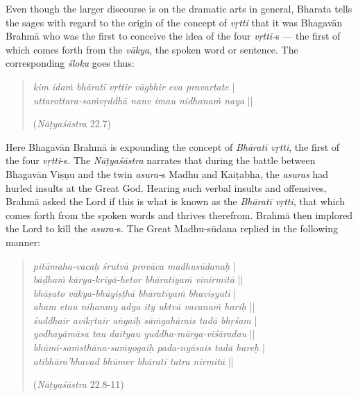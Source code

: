 Even though the larger discourse is on the dramatic arts in general, Bharata tells the sages with regard to the origin of the concept of \textsl{vṛtti} that it was Bhagavān Brahmā who was the first to conceive the idea of the four \textsl{vṛtti-}s --- the first of which comes forth from the \textsl{vākya}, the spoken word or sentence. The corresponding \textsl{śloka} goes thus:
\begin{quote}
\textsl{kim idaṁ bhāratī vṛttir vāgbhir eva pravartate} |  \\
\textsl{uttarottara-saṁvṛddhā nanv imau nidhanaṁ naya} || 

\hfill(\textsl{Nāṭyaśāstra} 22.7)
\end{quote}

Here Bhagavān Brahmā is expounding the concept of \textsl{Bhāratī vṛtti}, the first of the four \textsl{vṛtti}-s. The \textsl{Nāṭyaśāstra} narrates that during the battle between Bhagavān Viṣṇu and the twin \textsl{asura-}s Madhu and Kaiṭabha, the \textsl{asuras} had hurled insults at the Great God. Hearing such verbal insults and offensives, Brahmā asked the Lord if this is what is known as the \textsl{Bhāratī vṛtti}, that which comes forth from the spoken words and thrives therefrom. Brahmā then implored the Lord to kill the \textsl{asura-}s. The Great Madhu-sūdana replied in the following manner:
\begin{quote}
\textsl{pitāmaha-vacaḥ śrutvā provāca madhusūdanaḥ} |\\
\textsl{bāḍhaṁ kārya-kriyā-hetor bhāratīyaṁ vinirmitā} ||\\
\textsl{bhāṣato vākya-bhūyiṣṭhā bhāratīyaṁ bhaviṣyati} |\\
\textsl{aham etau nihanmy adya ity uktvā vacanaṁ hariḥ} ||\\
\textsl{śuddhair avikṛtair aṅgaiḥ sāṁgahārais tadā bhṛśam} |\\
\textsl{yodhayāmāsa tau daityau yuddha-mārga-viśāradau} ||\\
\textsl{bhūmi-saṁsthāna-saṁyogaiḥ pada-nyāsais tadā hareḥ} |\\
\textsl{atibhāro’bhavad bhūmer bhāratī tatra nirmitā} ||

\hfill (\textsl{Nāṭyaśāstra} 22.8-11)
\end{quote}

